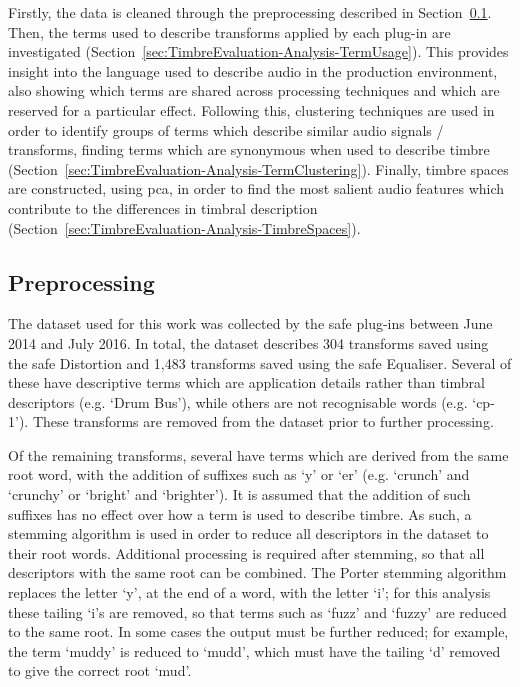 	Firstly, the data is cleaned through the preprocessing described in
	Section~\ref{sec:TimbreEvaluation-Analysis-Preprocessing}. Then, the terms used to describe transforms applied by
	each plug-in are investigated (Section~\ref{sec:TimbreEvaluation-Analysis-TermUsage}). This provides insight into
	the language used to describe audio in the production environment, also showing which terms are shared across
	processing techniques and which are reserved for a particular effect. Following this, clustering techniques are
	used in order to identify groups of terms which describe similar audio signals / transforms, finding terms which
	are synonymous when used to describe timbre (Section~\ref{sec:TimbreEvaluation-Analysis-TermClustering}). Finally,
	timbre spaces are constructed, using \acrshort{pca}, in order to find the most salient audio features which
	contribute to the differences in timbral description (Section~\ref{sec:TimbreEvaluation-Analysis-TimbreSpaces}).

	\subsection{Preprocessing}
	\label{sec:TimbreEvaluation-Analysis-Preprocessing}
		The dataset used for this work was collected by the \acrshort{safe} plug-ins between June 2014 and July
		2016. In total, the dataset describes 304 transforms saved using the \acrshort{safe} Distortion and 1,483
		transforms saved using the \acrshort{safe} Equaliser. Several of these have descriptive terms which are
		application details rather than timbral descriptors (e.g. `Drum Bus'), while others are not recognisable
		words (e.g. `cp-1'). These transforms are removed from the dataset prior to further processing.

		Of the remaining transforms, several have terms which are derived from the same root word, with the
		addition of suffixes such as `y' or `er' (e.g. `crunch' and `crunchy' or `bright' and `brighter'). It is
		assumed that the addition of such suffixes has no effect over how a term is used to describe timbre. As
		such, a stemming algorithm \citep{porter1980an} is used in order to reduce all descriptors in the dataset
		to their root words.  Additional processing is required after stemming, so that all descriptors with the
		same root can be combined.  The Porter stemming algorithm replaces the letter `y', at the end of a word,
		with the letter `i'; for this analysis these tailing `i's are removed, so that terms such as `fuzz' and
		`fuzzy' are reduced to the same root. In some cases the output must be further reduced; for example, the
		term `muddy' is reduced to `mudd', which must have the tailing `d' removed to give the correct root `mud'.

